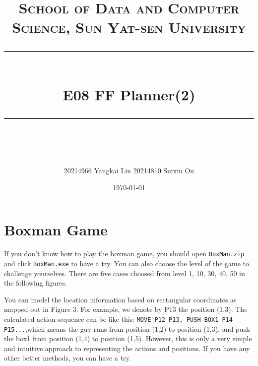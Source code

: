 \documentclass[a4paper, 11pt]{article}
\title{	
\normalfont \normalsize
\textsc{School of Data and Computer Science, Sun Yat-sen University} \\ [25pt] %
\rule{\textwidth}{0.5pt} \\[0.4cm] %
\huge  E08 FF Planner(2)\\ %
\rule{\textwidth}{2pt} \\[0.5cm] %
\author{20214966 Yangkai Lin 20214810 Suixin Ou}
\date{\normalsize\today}
}
\begin{document}
\maketitle
\tableofcontents
\newpage
\section{Boxman Game}
If you don't know how to play the boxman game, you should open \texttt{BoxMan.zip} and click \texttt{BoxMan.exe} to have a try.  You can also choose the level of the game to challenge yourselves. There are five cases choosed from level 1, 10, 30, 40, 50 in the following figures.

You can model the location information based on rectangular coordinates as mapped out in Figure 3. For example, we denote by P13 the position (1,3). The calculated action sequence can be like this: \texttt{MOVE P12 P13, PUSH BOX1 P14 P15...},which means the guy runs from position (1,2) to position (1,3), and push the box1 from position (1,4) to position (1,5). However, this is only a very simple and intuitive approach to representing the actions and positions. If you have any other better methods, you can have a try.
\end{document}
